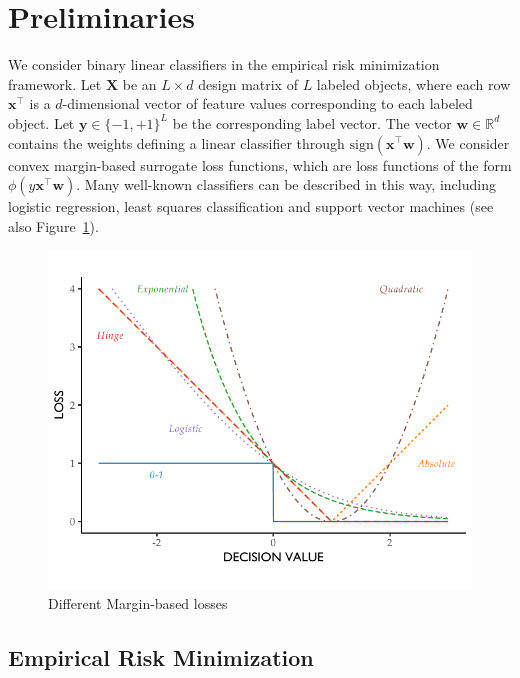 \documentclass[twoside]{memoir}\usepackage[]{graphicx}\usepackage{xcolor}
\makeatletter
\def\maxwidth{ %
  \ifdim\Gin@nat@width>\linewidth
    \linewidth
  \else
    \Gin@nat@width
  \fi
}
\newenvironment{knitrout}{}{} %
\makeatother
\begin{document}
\section{Preliminaries}
We consider binary linear classifiers in the empirical risk minimization framework. Let $\mathbf{X}$ be an $L \times d$ design matrix of $L$ labeled objects, where each row $\mathbf{x}^\top$ is a $d$-dimensional vector of feature values corresponding to each labeled object. Let $\mathbf{y} \in \{{-1},{+1}\}^L$ be the corresponding label vector. The vector $\mathbf{w} \in \mathbb{R}^d$ contains the weights defining a linear classifier through $\mathrm{sign}(\mathbf{x}^\top \mathbf{w})$. We consider convex margin-based surrogate loss functions, which are loss functions of the form $\phi(y \mathbf{x}^\top \mathbf{w})$. Many well-known classifiers can be described in this way, including logistic regression, least squares classification and support vector machines \citep{Bartlett2006} (see also Figure~\ref{figure:marginbasedlosses}).


\begin{knitrout}
\color{fgcolor}\begin{figure}
\includegraphics[width=\maxwidth]{figure/marginbasedlosses-1} \caption[Different Margin-based losses]{Different Margin-based losses}\label{figure:marginbasedlosses}
\end{figure}


\end{knitrout}


\subsection{Empirical Risk Minimization}
\end{document}
